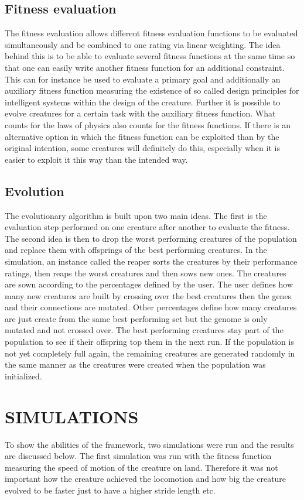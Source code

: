 \documentclass[letterpaper, 10 pt, conference]{ieeeconf}  %
\begin{document}
\subsection{Fitness evaluation}
The fitness evaluation allows different fitness evaluation functions to be evaluated simultaneously and be combined to one rating via linear weighting.
The idea behind this is to be able to evaluate several fitness functions at the same time so that one can easily write another fitness function for an additional constraint. This can for instance be used to evaluate a primary goal and additionally an auxiliary fitness function measuring the existence of so called design principles for intelligent systems within the design of the creature. Further it is possible to evolve creatures for a certain task with the auxiliary fitness function. What counts for the laws of physics also counts for the fitness functions. If there is an alternative option in which the fitness function can be exploited than by the original intention, some creatures will definitely do this, especially when it is easier to exploit it this way than the intended way.
\subsection{Evolution}
The evolutionary algorithm is built upon two main ideas. The first is the evaluation step performed on one creature after another to evaluate the fitness. The second idea is then to drop the worst performing creatures of the population and replace them with offsprings of the best performing creatures. In the simulation, an instance called the reaper sorts the creatures by their performance ratings, then reaps the worst creatures and then sows new ones. The creatures are sown according to the percentages defined by the user. The user defines how many new creatures are built by crossing over the best creatures then the genes and their connections are mutated. Other percentages define how many creatures are just create from the same best performing set but the genome is only mutated and not crossed over. The best performing creatures stay part of the population to see if their offspring top them in the next run. If the population is not yet completely full again, the remaining creatures are generated randomly in the same manner as the creatures were created when the population was initialized.

\section{SIMULATIONS}
To show the abilities of the framework, two simulations were run and the results are discussed below. The first simulation was run with the fitness function measuring the speed of motion of the creature on land. Therefore it was not important how the creature achieved the locomotion and how big the creature evolved to be faster just to have a higher stride length etc.
\end{document}
